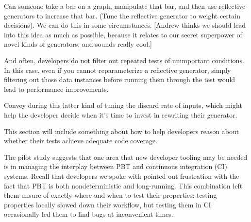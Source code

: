 Can someone take a bar on a graph, manipulate that bar, and
then use reflective generators to increase that bar. (Tune
the reflective generator to weight certain decisions). We
can do this in some circumstances. [Andrew thinks we should
lead into this idea as much as possible, because it relates
to our secret superpower of novel kinds of generators, and
sounds really cool.]

And often, developers do not filter out repeated tests of
unimportant conditions. In this case, even if you cannot
reparameterize a reflective generator, simply filtering out
those data instances before running them through the test
would lead to performance improvements.

Convey during this latter kind of tuning the discard rate of
inputs, which might help the developer decide when it's time
to invest in rewriting their generator.


This section will include something about how to help
developers reason about whether their tests achieve adequate
code coverage. 


 


The pilot study suggests that one area that new developer tooling may be
needed is in managing the interplay between PBT and continuous integration (CI)
systems. Recall that developers we spoke with pointed out frustration with the
fact that PBT is both nondeterministic and long-running. This combination left
them unsure of exactly where and when to test their properties: testing
properties locally slowed down their workflow, but testing them in CI
occasionally led them to find bugs at inconvenient times.

